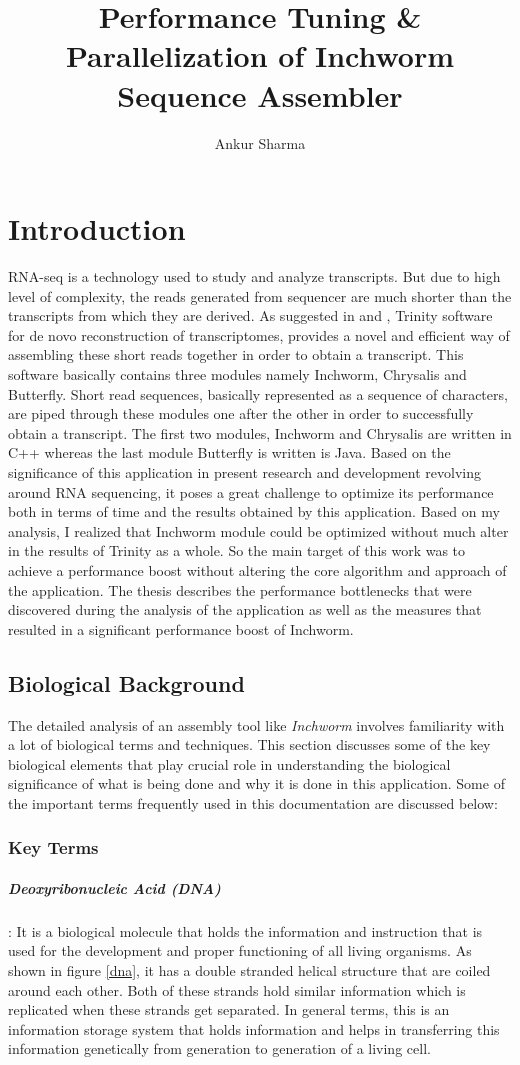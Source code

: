 \label{key}\documentclass[bachinf, english ,zihtitle,final,hyperref,utf8]{zihpub}
\author{Ankur Sharma}
\title{Performance Tuning \& Parallelization of Inchworm Sequence Assembler}
\begin{document}
\listoffigures
\newpage
\chapter{Introduction} 
RNA-seq is a technology used to study and analyze transcripts. But due to high level of complexity, the reads generated from sequencer are much shorter than the transcripts from which they are derived. As suggested in \cite{trinitynew} and \cite{Trinity}, Trinity software for de novo reconstruction of transcriptomes, provides a novel and efficient way of assembling these short reads together in order to obtain a transcript. This software basically contains three modules namely Inchworm, Chrysalis and Butterfly. Short read sequences, basically represented as a sequence of characters, are piped through these modules one after the other in order to successfully obtain a transcript. The first two modules, Inchworm and Chrysalis are written in C++ whereas the last module Butterfly is written is Java. Based on the significance of this application in present research and development revolving around RNA sequencing, it poses a great challenge to optimize its performance both in terms of time and the results obtained by this application. Based on my analysis, I realized that Inchworm module could be optimized without much alter in the results of Trinity as a whole. So the main target of this work was to achieve a performance boost  without altering the core algorithm and approach of the application. The thesis describes the performance bottlenecks that were discovered during the analysis of the application as well as the measures that resulted in a significant performance boost of Inchworm.
\section{Biological Background}
The detailed analysis of  an assembly tool like \emph{Inchworm} involves familiarity with a lot of biological terms and techniques. This section discusses some of the key biological elements that play crucial role in understanding the biological significance of what is being done and why it is done in this application. Some of the important terms frequently used in this documentation are discussed below:
\subsection{Key Terms}
\paragraph{Deoxyribonucleic Acid (DNA)}: It is a biological molecule that holds the information and instruction that is used for the development and proper functioning of all living organisms. As shown in figure \ref{dna}, it has a double stranded helical structure that are coiled around each other. Both of these strands hold similar information which is replicated when these strands get separated. In general terms, this is an information storage system that holds information and helps in transferring this information genetically from generation to generation of a living cell.
\end{document}
